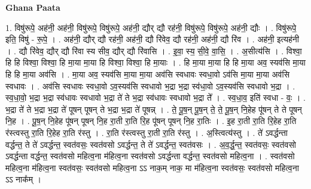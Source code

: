 \documentclass[17pt]{extarticle}
\begin{document}
\textbf{Ghana Paata } \newline

1. विषु॑रूपे॒ अह॑नी॒ अह॑नी॒ विषु॑रूपे॒ विषु॑रूपे॒ अह॑नी॒ द्यौर् द्यौ रह॑नी॒ विषु॑रूपे॒ विषु॑रूपे॒ अह॑नी॒ द्यौः । . विषु॑रूपे॒ इति॒ विषु॑ - रू॒पे॒ । . अह॑नी॒ द्यौर् द्यौ रह॑नी॒ अह॑नी॒ द्यौ रि॑वेव॒ द्यौ रह॑नी॒ अह॑नी॒ द्यौ रि॑व । . अह॑नी॒ इत्यह॑नी । . द्यौ रि॑वेव॒ द्यौर् द्यौ रि॑वा स्य सीव॒ द्यौर् द्यौ रि॑वासि । . इ॒वा॒ स्य॒ सी॒वे॒ वा॒सि॒ । . अ॒सीत्य॑सि । . विश्वा॒ हि हि विश्वा॒ विश्वा॒ हि मा॒या मा॒या हि विश्वा॒ विश्वा॒ हि मा॒याः । . हि मा॒या मा॒या हि हि मा॒या अव॒ स्यव॑सि मा॒या हि हि मा॒या अव॑सि । . मा॒या अव॒ स्यव॑सि मा॒या मा॒या अव॑सि स्वधावः स्वधा॒वो ऽव॑सि मा॒या मा॒या अव॑सि स्वधावः । . अव॑सि स्वधावः स्वधा॒वो ऽव॒स्यव॑सि स्वधावो भ॒द्रा भ॒द्रा स्व॑धा॒वो ऽव॒स्यव॑सि स्वधावो भ॒द्रा । . स्व॒धा॒वो॒ भ॒द्रा भ॒द्रा स्व॑धावः स्वधावो भ॒द्रा ते॑ ते भ॒द्रा स्व॑धावः स्वधावो भ॒द्रा ते᳚ । . स्व॒धा॒व॒ इति॑ स्वधा - वः॒ । . भ॒द्रा ते॑ ते भ॒द्रा भ॒द्रा ते॑ पूषन् पूषन् ते भ॒द्रा भ॒द्रा ते॑ पूषन्न् । . ते॒ पू॒ष॒न् पू॒ष॒न् ते॒ ते॒ पू॒ष॒न् नि॒हेह पू॑षन् ते ते पूषन् नि॒ह । . पू॒ष॒न् नि॒हेह पू॑षन् पूषन् नि॒ह रा॒ती रा॒ति रि॒ह पू॑षन् पूषन् नि॒ह रा॒तिः । . इ॒ह रा॒ती रा॒ति रि॒हेह रा॒ति र॑स्त्वस्तु रा॒ति रि॒हेह रा॒ति र॑स्तु । . रा॒ति र॑स्त्वस्तु रा॒ती रा॒ति र॑स्तु । . अ॒स्त्वित्य॑स्तु । . ते॑ ऽवर्द्धन्ता वर्द्धन्त॒ ते ते॑ ऽवर्द्धन्त॒ स्वत॑वसः॒ स्वत॑वसो ऽवर्द्धन्त॒ ते ते॑ ऽवर्द्धन्त॒ स्वत॑वसः । . अ॒व॒र्द्ध॒न्त॒ स्वत॑वसः॒ स्वत॑वसो ऽवर्द्धन्ता वर्द्धन्त॒ स्वत॑वसो महित्व॒ना म॑हित्व॒ना स्वत॑वसो ऽवर्द्धन्ता वर्द्धन्त॒ स्वत॑वसो महित्व॒ना । . स्वत॑वसो महित्व॒ना म॑हित्व॒ना स्वत॑वसः॒ स्वत॑वसो महित्व॒ना ऽऽ नाक॒म् नाक॒ मा म॑हित्व॒ना स्वत॑वसः॒ स्वत॑वसो महित्व॒ना ऽऽ नाक᳚म् । \newline
\end{document}
